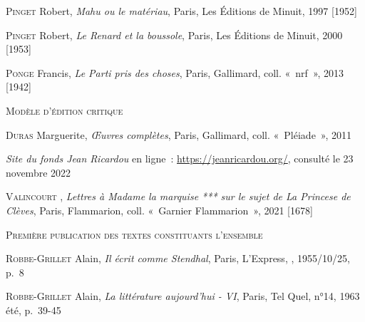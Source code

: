 \documentclass[12pt, a4paper]{article}
\begin{document}
		\textsc{Pinget} Robert, \textit{Mahu ou le matériau}, Paris, Les Éditions de Minuit, 1997 [1952]\par 
		 
		
	
		\textsc{Pinget} Robert, \textit{Le Renard et la boussole}, Paris, Les Éditions de Minuit, 2000 [1953]\par 
		 
		
	
		\textsc{Ponge} Francis, \textit{Le Parti pris des choses}, Paris, Gallimard, coll. «~nrf~», 2013 [1942]\par 
		 
		
	
		\vspace*{2cm}
		\setlength{\parindent}{0cm}
{\large\textsc{Modèle d'édition critique}}
		\vspace*{1cm}
		\setlength{\parindent}{25pt}
		
		
		
		
		\textsc{Duras} Marguerite, \textit{Œuvres complètes}, Paris, Gallimard, coll. «~Pléiade~», 2011\par 
		 
		
	
		\textit{Site du fonds Jean Ricardou} en ligne~: \hyperlink{https://jeanricardou.org/}{https://jeanricardou.org/}, consulté le 23 novembre 2022\par
		
		
		
	
		\textsc{Valincourt} , \textit{Lettres à Madame la marquise *** sur le sujet de La Princese de Clèves}, Paris, Flammarion, coll. «~Garnier Flammarion~», 2021 [1678]\par 
		 
		
	
		\vspace*{2cm}
		\setlength{\parindent}{0cm}
{\large\textsc{Première publication des textes constituants l'ensemble}}
		\vspace*{1cm}
		\setlength{\parindent}{25pt}
		
		
		
		
		\textsc{Robbe-Grillet} Alain, \textit{Il écrit comme Stendhal}, Paris, L'Express, , 1955/10/25, p.~8\par
		
		
		
		
	
		\textsc{Robbe-Grillet} Alain, \textit{La littérature aujourd'hui - VI}, Paris, Tel Quel, n°14, 1963 été, p.~39-45\par
		
\end{document}
